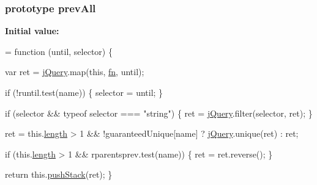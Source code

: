\subsubsection[{\texorpdfstring{prev\+All}{prevAll}}]{ {\bf prototype} prev\+All}\hypertarget{jquery-2_82_81-vsdoc_8js_a919573a4164877583504b17f0594a6a1}{}\label{jquery-2_82_81-vsdoc_8js_a919573a4164877583504b17f0594a6a1}
{\bfseries Initial value\+:}
\begin{DoxyCode}
= \textcolor{keyword}{function} (until, selector) \{
        

        var ret = \hyperlink{jquery-2_82_81-vsdoc_8js_add5237586d970a38a81f990e8eb28c6c}{jQuery}.map(\textcolor{keyword}{this}, \hyperlink{jquery-2_82_81-vsdoc_8js_acef6bdaf6b9b20fdcca1ea86f0902c3b}{fn}, until);

        \textcolor{keywordflow}{if} (!runtil.test(name)) \{
            selector = until;
        \}

        \textcolor{keywordflow}{if} (selector && typeof selector === \textcolor{stringliteral}{"string"}) \{
            ret = \hyperlink{jquery-2_82_81-vsdoc_8js_add5237586d970a38a81f990e8eb28c6c}{jQuery}.filter(selector, ret);
        \}

        ret = this.\hyperlink{jquery-2_82_81-vsdoc_8js_aa7de35d58da66d9944ab9cbe82c19640}{length} > 1 && !guaranteedUnique[name] ? \hyperlink{jquery-2_82_81-vsdoc_8js_add5237586d970a38a81f990e8eb28c6c}{jQuery}.unique(ret) : ret;

        \textcolor{keywordflow}{if} (this.\hyperlink{jquery-2_82_81-vsdoc_8js_aa7de35d58da66d9944ab9cbe82c19640}{length} > 1 && rparentsprev.test(name)) \{
            ret = ret.reverse();
        \}

        \textcolor{keywordflow}{return} this.\hyperlink{jquery-2_82_81-vsdoc_8js_afc3a7db1ef2b526338c06c07cecccd44}{pushStack}(ret);
    \}
\end{DoxyCode}
